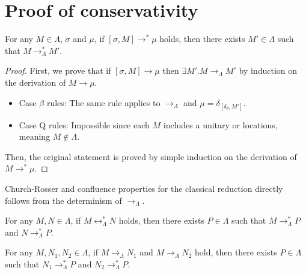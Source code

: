 \section{Proof of conservativity} \label{sec:conserv-proof}

\begin{lem} \label{lem:classical-step}
  For any $M \in \Lambda$, $\sigma$ and $\mu$, if $[\sigma, M] \longrightarrow^* \mu$ holds, then there exists $M' \in \Lambda$ such that $M \longrightarrow^*_\Lambda M'$.
\end{lem}
\begin{proof}
  First, we prove that if $[\sigma, M] \longrightarrow \mu$ then $\exists M'. M \longrightarrow_\Lambda M'$ by induction on the derivation of $M \longrightarrow \mu$.
  \begin{itemize}
    \item Case $\beta$ rules: The same rule applies to $\longrightarrow_\Lambda$ and $\mu = \delta_{[\delta_\emptyset, M']}$.
    \item Case \textsc{Q} rules: Impossible since each $M$ includes a unitary or locations, meaning $M \notin \Lambda$.
  \end{itemize}
  Then, the original statement is proved by simple induction on the derivation of $M \longrightarrow^* \mu$.
\end{proof}

Church-Rosser and confluence properties for the classical reduction directly follows from the determinism of $\longrightarrow_\Lambda$.
\begin{lem} \label{lem:classical-confluent}
  For any $M, N \in \Lambda$, if $M \longleftrightarrow^*_\Lambda N$ holds, then there exists $P \in \Lambda$ such that $M \longrightarrow^*_\Lambda P$ and $N \longrightarrow^*_\Lambda P$.
\end{lem}
\begin{lem} \label{lem:classical-confluent-single}
  For any $M, N_1, N_2 \in \Lambda$, if $M \longrightarrow_\Lambda N_1$ and $M \longrightarrow_\Lambda N_2$ hold, then there exists $P \in \Lambda$ such that $N_1 \longrightarrow^*_\Lambda P$ and $N_2 \longrightarrow^*_\Lambda P$.
\end{lem}

